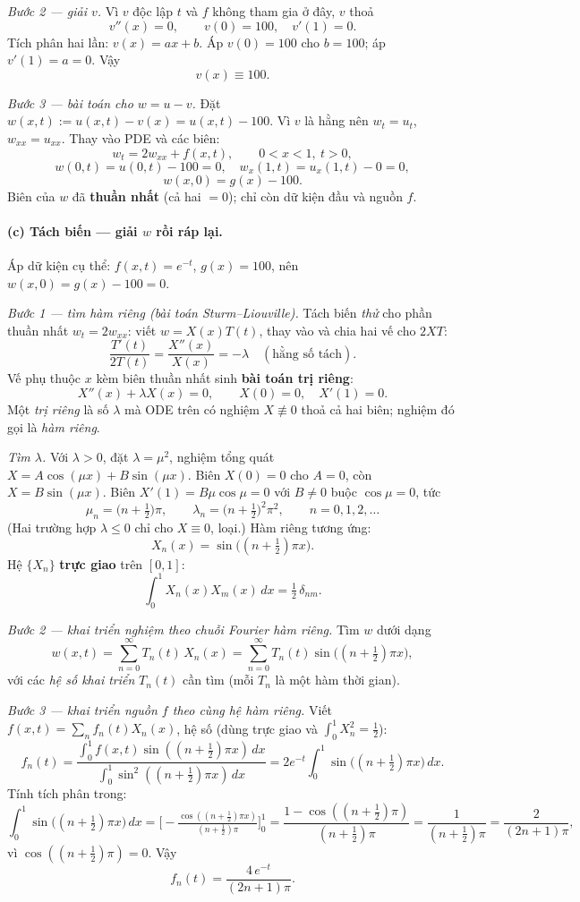 \emph{Bước 2 --- giải $v$.} Vì $v$ độc lập $t$ và $f$ không tham gia ở đây, $v$ thoả
\[
v''(x)=0,\qquad v(0)=100,\quad v'(1)=0.
\]
Tích phân hai lần: $v(x)=ax+b$. Áp $v(0)=100$ cho $b=100$; áp $v'(1)=a=0$. Vậy
\[
\boxed{v(x)\equiv 100.}
\]

\emph{Bước 3 --- bài toán cho $w=u-v$.} Đặt $w(x,t):=u(x,t)-v(x)=u(x,t)-100$. Vì $v$ là hằng nên $w_t=u_t$, $w_{xx}=u_{xx}$. Thay vào PDE và các biên:
\[
w_t=2w_{xx}+f(x,t),\qquad 0<x<1,\ t>0,
\]
\[
w(0,t)=u(0,t)-100=0,\quad w_x(1,t)=u_x(1,t)-0=0,
\]
\[
w(x,0)=g(x)-100.
\]
Biên của $w$ đã \textbf{thuần nhất} (cả hai $=0$); chỉ còn dữ kiện đầu và nguồn $f$.

\paragraph{(c) Tách biến --- giải $w$ rồi ráp lại.}\leavevmode

Áp dữ kiện cụ thể: $f(x,t)=e^{-t}$, $g(x)=100$, nên $w(x,0)=g(x)-100=0$.

\emph{Bước 1 --- tìm hàm riêng (bài toán Sturm--Liouville).} Tách biến \emph{thử} cho phần thuần nhất $w_t=2w_{xx}$: viết $w=X(x)T(t)$, thay vào và chia hai vế cho $2XT$:
\[
\frac{T'(t)}{2T(t)}=\frac{X''(x)}{X(x)}=-\lambda\quad(\text{hằng số tách}).
\]
Vế phụ thuộc $x$ kèm biên thuần nhất sinh \textbf{bài toán trị riêng}:
\[
X''(x)+\lambda X(x)=0,\qquad X(0)=0,\quad X'(1)=0.
\]
Một \emph{trị riêng} là số $\lambda$ mà ODE trên có nghiệm $X\not\equiv0$ thoả cả hai biên; nghiệm đó gọi là \emph{hàm riêng}.

\emph{Tìm $\lambda$.} Với $\lambda>0$, đặt $\lambda=\mu^2$, nghiệm tổng quát $X=A\cos(\mu x)+B\sin(\mu x)$. Biên $X(0)=0$ cho $A=0$, còn $X=B\sin(\mu x)$. Biên $X'(1)=B\mu\cos\mu=0$ với $B\ne0$ buộc $\cos\mu=0$, tức
\[
\mu_n=\big(n+\tfrac12\big)\pi,\qquad \lambda_n=\big(n+\tfrac12\big)^2\pi^2,\qquad n=0,1,2,\dots
\]
(Hai trường hợp $\lambda\le0$ chỉ cho $X\equiv0$, loại.) Hàm riêng tương ứng:
\[
X_n(x)=\sin\!\big((n+\tfrac12)\pi x\big).
\]
Hệ $\{X_n\}$ \textbf{trực giao} trên $[0,1]$:
\[
\int_0^1 X_n(x)X_m(x)\,dx=\tfrac12\,\delta_{nm}.
\]

\emph{Bước 2 --- khai triển nghiệm theo chuỗi Fourier hàm riêng.} Tìm $w$ dưới dạng
\[
w(x,t)=\sum_{n=0}^{\infty} T_n(t)\,X_n(x)=\sum_{n=0}^{\infty} T_n(t)\sin\!\big((n+\tfrac12)\pi x\big),
\]
với các \emph{hệ số khai triển} $T_n(t)$ cần tìm (mỗi $T_n$ là một hàm thời gian).

\emph{Bước 3 --- khai triển nguồn $f$ theo cùng hệ hàm riêng.} Viết $f(x,t)=\sum_n f_n(t)X_n(x)$, hệ số (dùng trực giao và $\int_0^1 X_n^2=\tfrac12$):
\[
f_n(t)=\frac{\int_0^1 f(x,t)\sin((n+\tfrac12)\pi x)\,dx}{\int_0^1 \sin^2((n+\tfrac12)\pi x)\,dx}
=2e^{-t}\int_0^1 \sin\!\big((n+\tfrac12)\pi x\big)\,dx.
\]
Tính tích phân trong:
\[
\int_0^1\!\sin\!\big((n+\tfrac12)\pi x\big)\,dx
=\Big[-\tfrac{\cos((n+\tfrac12)\pi x)}{(n+\tfrac12)\pi}\Big]_0^1
=\frac{1-\cos((n+\tfrac12)\pi)}{(n+\tfrac12)\pi}=\frac{1}{(n+\tfrac12)\pi}=\frac{2}{(2n+1)\pi},
\]
vì $\cos((n+\tfrac12)\pi)=0$. Vậy
\[
f_n(t)=\frac{4\,e^{-t}}{(2n+1)\pi}.
\]

